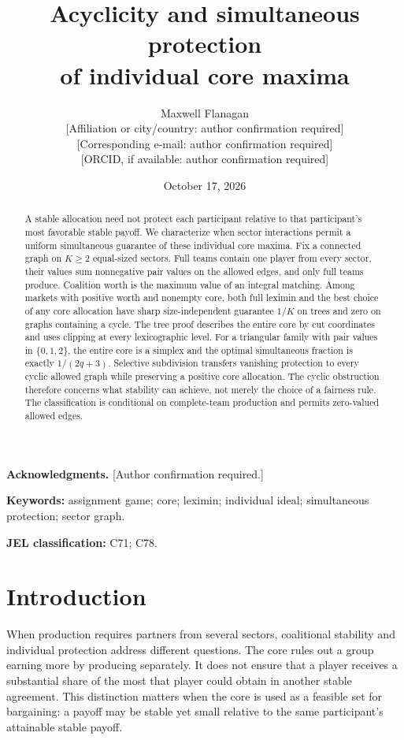 \documentclass[11pt]{article}
\title{Acyclicity and simultaneous protection\\of individual core maxima}
\author{Maxwell Flanagan\\[3pt]
\small [Affiliation or city/country: author confirmation required]\\
\small [Corresponding e-mail: author confirmation required]\\
\small [ORCID, if available: author confirmation required]}
\date{October 17, 2026}
\theoremstyle{remark}\newtheorem{remark}[theorem]{Remark}
\begin{document}
\maketitle
{\small\noindent\textbf{Acknowledgments.} [Author confirmation required.]\par}
\begin{abstract}
A stable allocation need not protect each participant relative to that
participant's most favorable stable payoff. We characterize when sector
interactions permit a uniform simultaneous guarantee of these individual core
maxima. Fix a connected graph on $K\ge2$ equal-sized sectors. Full teams contain
one player from every sector, their values sum nonnegative pair values on the
allowed edges, and only full teams produce. Coalition worth is the maximum
value of an integral matching. Among markets with positive worth and nonempty
core, both full leximin and the best choice of any core allocation have sharp
size-independent guarantee $1/K$ on trees and zero on graphs containing a
cycle. The tree proof describes the entire core by cut coordinates and uses
clipping at every lexicographic level. For a triangular family with pair values
in $\{0,1,2\}$, the entire core is a simplex and the optimal simultaneous
fraction is exactly $1/(2q+3)$. Selective subdivision transfers vanishing
protection to every cyclic allowed graph while preserving a positive core
allocation. The cyclic obstruction therefore concerns what stability can
achieve, not merely the choice of a fairness rule. The classification is
conditional on complete-team production and permits zero-valued allowed edges.
\end{abstract}
\noindent\textbf{Keywords:} assignment game; core; leximin; individual ideal;
simultaneous protection; sector graph.
\par\noindent\textbf{JEL classification:} C71; C78.

\section{Introduction}
When production requires partners from several sectors, coalitional stability
and individual protection address different questions. The core rules out a
group earning more by producing separately. It does not ensure that a player
receives a substantial share of the most that player could obtain in another
stable agreement. This distinction matters when the core is used as a feasible
set for bargaining: a payoff may be stable yet small relative to the same
participant's attainable stable payoff.
\end{document}
